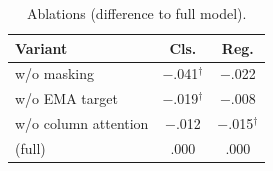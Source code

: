 \begin{table}[t]
\caption{Ablations (difference to full model).}\label{tab:abl}
\centering\small
\begin{tabular}{lcc}
\toprule
Variant & Cls. & Reg. \\
\midrule
w/o masking & $-$.041$^\dagger$ & $-$.022 \\
w/o EMA target & $-$.019$^\dagger$ & $-$.008 \\
w/o column attention & $-$.012 & $-$.015$^\dagger$ \\
\weft{} (full) & .000 & .000 \\
\bottomrule
\end{tabular}
\end{table}
